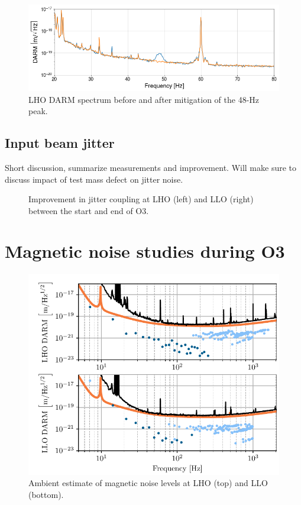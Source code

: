 \begin{figure}
	\centering
	\includegraphics[width=\textwidth]{figures/48Hz.png}
	\caption{LHO DARM spectrum before and after mitigation of the 48-Hz peak.}
	\label{fig:48hz}
\end{figure}

\subsection{Input beam jitter}\label{sec:noise-vib-jitter}

{\color{red}
Short discussion, summarize measurements and improvement.
Will make sure to discuss impact of test mass defect on jitter noise.}

\begin{figure}
	\centering
	\caption{Improvement in jitter coupling at LHO (left) and LLO (right) between the start and end of O3.}
	\label{fig:jitter}
\end{figure}

\section{Magnetic noise studies during O3}\label{sec:noise-mag}

\begin{figure}[h]
	\centering
	\includegraphics[width=\textwidth]{figures/ambient_mag.pdf}
	\caption{
		Ambient estimate of magnetic noise levels at LHO (top) and LLO (bottom).}
	\label{fig:ambient-mag}
\end{figure}

